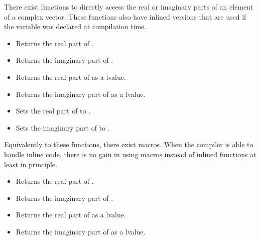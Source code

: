 There exist functions to directly access the real or imaginary parts of an
element of a complex vector. These functions also have inlined versions that
are used if the variable  was declared at compilation time.

\begin{itemize}
\item {}
  \sshortdescribe Returns the real part of .
  
\item {}
  \sshortdescribe Returns the imaginary part of .

\item {}
  \sshortdescribe Returns the real part of  as a lvalue.

\item {}
  \sshortdescribe Returns the imaginary part of  as a lvalue.

\item {}
  \sshortdescribe Sets the real part of  to .

\item {}
  \sshortdescribe Sets the imaginary part of  to .
\end{itemize}

Equivalently to these functions, there exist macros. When the compiler is able
to handle inline code, there is no gain in using macros instead of inlined
functions at least in principle.
\begin{itemize}
\item {}
  \sshortdescribe Returns the real part of .
  
\item {}
  \sshortdescribe Returns the imaginary part of .
  
\item {}
  \sshortdescribe Returns the real part of  as a lvalue.
  
\item {}
  \sshortdescribe Returns the imaginary part of  as a lvalue.
\end{itemize}

